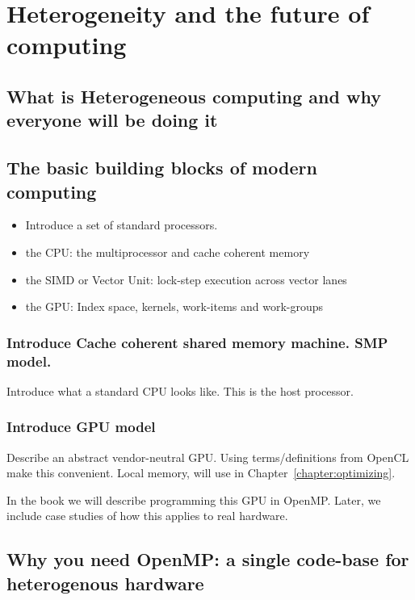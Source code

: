 
\chapter{Heterogeneity and the future of computing}
\label{chapter:heterogeneity}

\section{What is Heterogeneous computing and why everyone will be doing it}

\section{The basic building blocks of modern computing}

\begin{itemize}
\item Introduce a set of standard processors.
\item  the CPU: the multiprocessor and cache coherent memory
\item  the SIMD or Vector Unit: lock-step execution across vector lanes
\item  the GPU:  Index space, kernels, work-items and work-groups
\end{itemize}

\subsection{Introduce Cache coherent shared memory machine. SMP model.}
Introduce what a standard CPU looks like. This is the host processor.

\subsection{Introduce GPU model}
Describe an abstract vendor-neutral GPU.
Using terms/definitions from OpenCL make this convenient.
Local memory, will use in Chapter~\ref{chapter:optimizing}.

In the book we will describe programming this GPU in OpenMP.
Later, we include case studies of how this applies to real hardware.


\section{Why you need OpenMP: a single code-base for heterogenous hardware}



